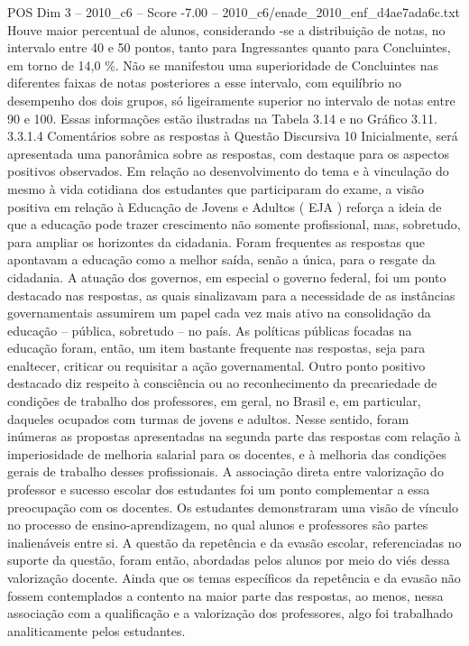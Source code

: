 \begin{textsample}{POS Dim 3 – 2010\_c6 – Score -7.00 – 2010\_c6/enade\_2010\_enf\_d4ae7ada6c.txt}
Houve maior percentual de alunos, considerando -se a distribuição de notas, no intervalo entre 40 e 50 pontos, tanto para Ingressantes quanto para Concluintes, em torno de 14,0 \%.
Não se manifestou uma superioridade de Concluintes nas diferentes faixas de notas posteriores a esse intervalo, com equilíbrio no desempenho dos dois grupos, só ligeiramente superior no intervalo de notas entre 90 e 100.
Essas informações estão ilustradas na Tabela 3.14 e no Gráfico 3.11. 3.3.1.4 Comentários sobre as respostas à Questão Discursiva 10 Inicialmente, será apresentada uma panorâmica sobre as respostas, com destaque para os aspectos positivos observados.
Em relação ao desenvolvimento do tema e à vinculação do mesmo à vida cotidiana dos estudantes que participaram do exame, a visão positiva em relação à Educação de Jovens e Adultos ( EJA ) reforça a ideia de que a educação pode trazer crescimento não somente profissional, mas, sobretudo, para ampliar os horizontes da cidadania.
Foram frequentes as respostas que apontavam a educação como a melhor saída, senão a única, para o resgate da cidadania.
A atuação dos governos, em especial o governo federal, foi um ponto destacado nas respostas, as quais sinalizavam para a necessidade de as instâncias governamentais assumirem um papel cada vez mais ativo na consolidação da educação – pública, sobretudo – no país.
As políticas públicas focadas na educação foram, então, um item bastante frequente nas respostas, seja para enaltecer, criticar ou requisitar a ação governamental.
Outro ponto positivo destacado diz respeito à consciência ou ao reconhecimento da precariedade de condições de trabalho dos professores, em geral, no Brasil e, em particular, daqueles ocupados com turmas de jovens e adultos.
Nesse sentido, foram inúmeras as propostas apresentadas na segunda parte das respostas com relação à imperiosidade de melhoria salarial para os docentes, e à melhoria das condições gerais de trabalho desses profissionais.
A associação direta entre valorização do professor e sucesso escolar dos estudantes foi um ponto complementar a essa preocupação com os docentes.
Os estudantes demonstraram uma visão de vínculo no processo de ensino-aprendizagem, no qual alunos e professores são partes inalienáveis entre si.
A questão da repetência e da evasão escolar, referenciadas no suporte da questão, foram então, abordadas pelos alunos por meio do viés dessa valorização docente.
Ainda que os temas específicos da repetência e da evasão não fossem contemplados a contento na maior parte das respostas, ao menos, nessa associação com a qualificação e a valorização dos professores, algo foi trabalhado analiticamente pelos estudantes.

\end{textsample}
